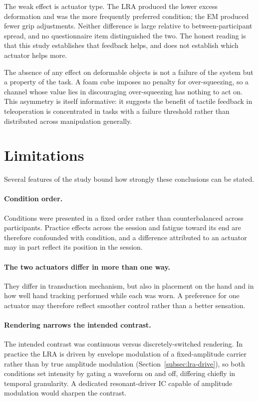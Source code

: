 \documentclass[12pt, a4paper, twoside, openright]{report}
\begin{document}
The weak effect is actuator type. The LRA produced the lower excess deformation
and was the more frequently preferred condition; the EM produced fewer grip
adjustments. Neither difference is large relative to between-participant spread,
and no questionnaire item distinguished the two. The honest reading is that this
study establishes that feedback helps, and does not establish which actuator
helps more.

The absence of any effect on deformable objects is not a failure of the system
but a property of the task. A foam cube imposes no penalty for over-squeezing,
so a channel whose value lies in discouraging over-squeezing has nothing to act
on. This asymmetry is itself informative: it suggests the benefit of tactile
feedback in teleoperation is concentrated in tasks with a failure threshold
rather than distributed across manipulation generally.

\section{Limitations}
\label{sec:limitations}

Several features of the study bound how strongly these conclusions can be
stated.

\paragraph{Condition order.} Conditions were presented in a fixed order rather
than counterbalanced across participants. Practice effects across the session
and fatigue toward its end are therefore confounded with condition, and a
difference attributed to an actuator may in part reflect its position in the
session.

\paragraph{The two actuators differ in more than one way.} They differ in
transduction mechanism, but also in placement on the hand and in how well hand
tracking performed while each was worn. A preference for one actuator may
therefore reflect smoother control rather than a better sensation.

\paragraph{Rendering narrows the intended contrast.} The intended contrast was
continuous versus discretely-switched rendering. In practice the LRA is driven
by envelope modulation of a fixed-amplitude carrier rather than by true
amplitude modulation (Section~\ref{subsec:lra-drive}), so both conditions set
intensity by gating a waveform on and off, differing chiefly in temporal
granularity. A dedicated resonant-driver IC capable of amplitude modulation
would sharpen the contrast.
\end{document}
